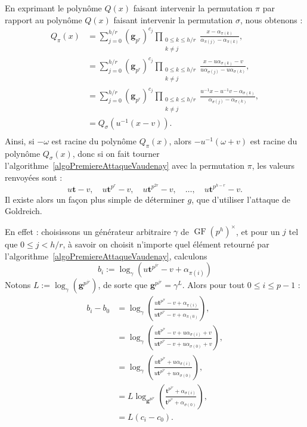 \documentclass[a4paper, titlepage, 11pt]{article}
\theoremstyle{definition}
\theoremstyle{remark}
\def\gf{\operatorname{GF}}
\def\mbf#1{\mathbf{#1}}
\begin{document}
En exprimant le polynôme $Q(x)$ faisant intervenir la permutation $\pi$ par rapport au polynôme $Q(x)$ faisant intervenir la permutation $\sigma$, nous obtenons :
\begin{align*}
Q_\pi(x) &= \sum_{j=0}^{h/r} (\mbf g_{p^r})^{c_{j}} \prod_{\substack{0\leqslant k\leqslant h/r \\ k \neq j}}\frac{x-\alpha_{\pi(k)}}{\alpha_{\pi(j)}-\alpha_{\pi(k)}}, \\
&= \sum_{j=0}^{h/r} (\mbf g_{p^r})^{c_{j}} \prod_{\substack{0\leqslant k\leqslant h/r \\ k \neq j}}\frac{x-u\alpha_{\sigma(k)} - v}{u\alpha_{\sigma(j)}-u\alpha_{\sigma(k)}}, \\
&= \sum_{j=0}^{h/r} (\mbf g_{p^r})^{c_{j}} \prod_{\substack{0\leqslant k\leqslant h/r \\ k \neq j}}\frac{u^{-1}x - u^{-1}v-\alpha_{\sigma(k)}}{\alpha_{\sigma(j)}-\alpha_{\sigma(k)}}, \\
&= Q_\sigma(u^{-1}(x -v)). \\
\end{align*}
Ainsi, si $-\omega$ est racine du polynôme $Q_\pi(x)$, alors $-u^{-1}(\omega +v)$ est racine du polynôme $Q_\sigma(x)$, donc si on fait tourner l'algorithme~\ref{algoPremiereAttaqueVaudenay} avec la permutation $\pi$, les valeurs renvoyées sont :
$$u \mbf t -v,\quad u \mbf t^{p^r} -v,\quad u \mbf t^{p^{2r}} -v,\quad \dots,\quad u \mbf t^{p^{h - r}} -v.$$
Il existe alors un façon plus simple de déterminer $g$, que d'utiliser l'attaque de Goldreich.

En effet : choisissons un générateur arbitraire $\gamma$ de $\gf(p^h)^\times$, et pour un $j$ tel que $0 \leqslant j < h/r$, à savoir on choisit n'importe quel élément retourné par l'algorithme~\ref{algoPremiereAttaqueVaudenay}, calculons $$b_i := \log_{\gamma}\left(u \mbf t^{p^{jr}} -v+\alpha_{\pi(i)}\right)$$
Notons $L := \log_{\gamma}(\mbf g^{p^{jr}})$, de sorte que $\mbf g^{p^{jr}}=\gamma^L$. Alors pour tout $0 \leqslant i \leqslant p-1$ :
\begin{align*}
b_i - b_0 &= \log_{\gamma}\left(\frac{u \mbf t^{p^{jr}} -v + \alpha_{\pi(i)}}{u \mbf t^{p^{jr}} -v + \alpha_{\pi(0)}}\right), \\
&= \log_{\gamma}\left(\frac{u \mbf t^{p^{jr}} -v + u \alpha_{\sigma(i)}+v}{u \mbf t^{p^{jr}} -v + u \alpha_{\sigma(0)}+v}\right),\\
&= \log_{\gamma}\left(\frac{u \mbf t^{p^{jr}} + u \alpha_{\sigma(i)}}{u \mbf t^{p^{jr}} + u \alpha_{\sigma(0)}}\right),\\
&= L\log_{\mbf g^{p^{jr}}}\left(\frac{\mbf t^{p^{jr}} + \alpha_{\sigma(i)}}{\mbf t^{p^{jr}} + \alpha_{\sigma(0)}}\right),\\
&= L(c_i - c_0). \\
\end{align*}
\end{document}
